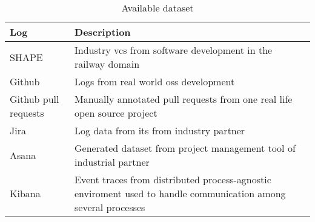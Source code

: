 \begin{table}[]
\centering
\caption{Available dataset}
\label{tab:dataset}
\begin{tabular}{@{}m{2.5cm}m{9cm}@{}}
\toprule
\textbf{Log} & \textbf{Description} \\ \midrule
SHAPE & Industry \gls{vcs} from software development in the railway domain \\
Github & Logs from real world \gls{oss} development \\
Github pull requests & Manually annotated pull requests from one real life open source project \\
Jira & Log data from \gls{its} from industry partner \\
Asana & Generated dataset from project management tool of industrial partner \\
Kibana & Event traces from distributed process-agnostic enviroment used to handle communication among several processes \\ \bottomrule
\end{tabular}
\end{table}